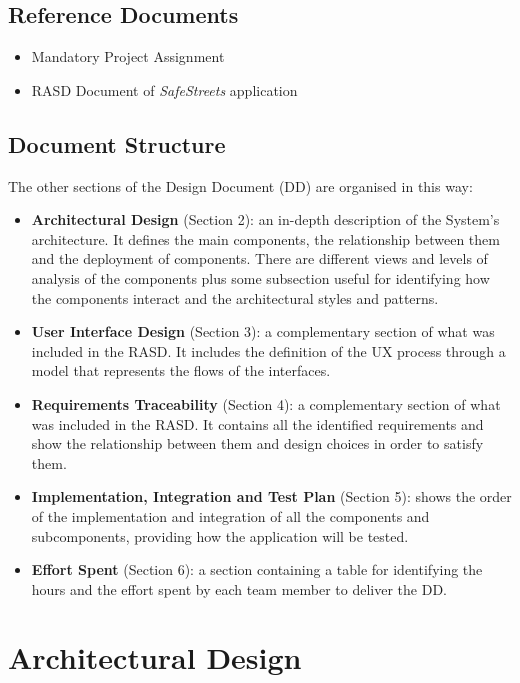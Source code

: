 \documentclass{article}
\begin{document}
	
		\subsection{Reference Documents}
			\begin{itemize}
				\item Mandatory Project Assignment
				\item RASD Document of {\it SafeStreets} application
			\end{itemize} 
	
		\subsection{Document Structure}
		The other sections of the Design Document (DD) are organised in this way:
			\begin{itemize}
				\item {\bf Architectural Design} (Section 2): an in-depth description of the System's architecture. It defines the main components, the relationship between them and the deployment of components. There are different views and levels of analysis of the components plus some subsection useful for identifying how the components interact and the architectural styles and patterns. 
				\item {\bf User Interface Design} (Section 3): a complementary section of what was included in the RASD. It includes the definition of the UX process through a model that represents the flows of the interfaces. 
				\item {\bf Requirements Traceability} (Section 4): a complementary section of what was included in the RASD. It contains all the identified requirements and show the relationship between them and design choices in order to satisfy them. 
				\item {\bf Implementation, Integration and Test Plan} (Section 5): shows the order of the implementation and integration of all the components and subcomponents, providing how the application will be tested.
				\item {\bf Effort Spent} (Section 6): a section containing a table for identifying the hours and the effort spent by each team member to deliver the DD.
			\end{itemize}
		
		\pagebreak
	
	
\section{Architectural Design}
\end{document}
